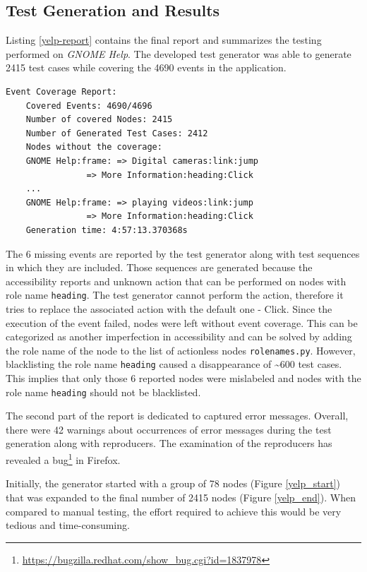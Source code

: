 \subsection{Test Generation and Results}

Listing \ref{yelp-report} contains the final report and summarizes the testing performed on \textit{GNOME Help}. The developed test generator was able to generate 2415 test cases while covering the 4690 events in the application. 

\begin{lstlisting}[caption={Final test generator report},label={yelp-report}]
    Event Coverage Report:
    Covered Events: 4690/4696
    Number of covered Nodes: 2415
    Number of Generated Test Cases: 2412
    Nodes without the coverage:
    GNOME Help:frame: => Digital cameras:link:jump 
                => More Information:heading:Click
    ...
    GNOME Help:frame: => playing videos:link:jump
                => More Information:heading:Click 
    Generation time: 4:57:13.370368s
\end{lstlisting}

The 6 missing events are reported by the test generator along with test sequences in which they are included. Those sequences are generated because the accessibility reports and unknown action that can be performed on nodes with role name \texttt{heading}. The test generator cannot perform the action, therefore it tries to replace the associated action with the default one - Click. Since the execution of the event failed, nodes were left without event coverage. This can be categorized as another imperfection in accessibility and can be solved by adding the role name of the node to the list of actionless nodes \texttt{rolenames.py}. However, blacklisting the role name \texttt{heading} caused a disappearance of \textasciitilde600 test cases. This implies that only those 6 reported nodes were mislabeled and nodes with the role name \texttt{heading} should not be blacklisted.  

The second part of the report is dedicated to captured error messages. Overall, there were 42 warnings about occurrences of error messages during the test generation along with reproducers. The examination of the reproducers has revealed a bug\footnote{\url{https://bugzilla.redhat.com/show_bug.cgi?id=1837978}} in Firefox. 

Initially, the generator started with a group of 78 nodes (Figure \ref{yelp_start}) that was expanded to the final number of 2415 nodes (Figure \ref{yelp_end}). When compared to manual testing, the effort required to achieve this would be very tedious and time-consuming. 




